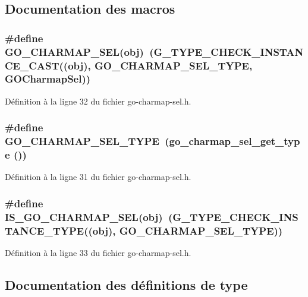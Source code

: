 \subsection{Documentation des macros}
\subsubsection[{GO\_\-CHARMAP\_\-SEL}]{\setlength{\rightskip}{0pt plus 5cm}\#define GO\_\-CHARMAP\_\-SEL(obj)~(G\_\-TYPE\_\-CHECK\_\-INSTANCE\_\-CAST((obj), GO\_\-CHARMAP\_\-SEL\_\-TYPE, {\bf GOCharmapSel}))}\label{go-charmap-sel_8h_ab9c1182640953af0f29175052b3301d2}


Définition à la ligne 32 du fichier go-\/charmap-\/sel.h.

\subsubsection[{GO\_\-CHARMAP\_\-SEL\_\-TYPE}]{\setlength{\rightskip}{0pt plus 5cm}\#define GO\_\-CHARMAP\_\-SEL\_\-TYPE~(go\_\-charmap\_\-sel\_\-get\_\-type ())}\label{go-charmap-sel_8h_ac6cf70df7480c351ce26c60b6c5c70c1}


Définition à la ligne 31 du fichier go-\/charmap-\/sel.h.

\subsubsection[{IS\_\-GO\_\-CHARMAP\_\-SEL}]{\setlength{\rightskip}{0pt plus 5cm}\#define IS\_\-GO\_\-CHARMAP\_\-SEL(obj)~(G\_\-TYPE\_\-CHECK\_\-INSTANCE\_\-TYPE((obj), GO\_\-CHARMAP\_\-SEL\_\-TYPE))}\label{go-charmap-sel_8h_a6047824b054a7bdcfbe0824e1809fbdb}


Définition à la ligne 33 du fichier go-\/charmap-\/sel.h.



\subsection{Documentation des définitions de type}
